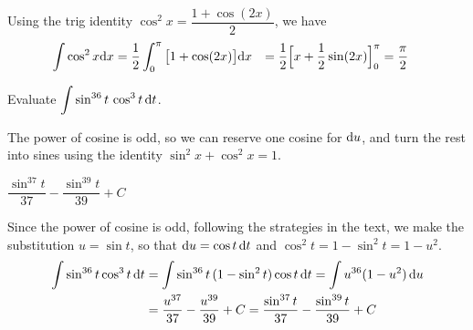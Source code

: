 \begin{solution}
Using the trig identity $\cos^2 x=\dfrac{1+\cos(2x)}{2}$, we have
\begin{alignat*}{3}
\int \cos^2 x\dee{x}
&= \frac{1}{2}\int_0^\pi \big[1+\cos(2x)\big]\dee{x}  %
&= \frac{1}{2} \Big[x+\frac{1}{2}\sin(2x)\Big]_0^\pi
&=\frac{\pi}{2}
\end{alignat*}
\end{solution}



\begin{question}[2016Q3]
Evaluate $\displaystyle\int\sin^{36}t\,\cos^3t\,\mathrm{d}t$.
\end{question}

\begin{hint}
The power of cosine is odd, so we can reserve one cosine for $\mathrm{d}u$, and turn the rest into sines using the identity $\sin^2 x + \cos^2 x =1$.
\end{hint}

\begin{answer}
$\dfrac{\sin^{37}t}{37}-\dfrac{\sin^{39}t}{39}+C$
\end{answer}

\begin{solution}
Since the power of cosine is odd, following the strategies in the text, we make the substitution $u=\sin t$, so that $\mathrm{d}u=\cos t\,\mathrm{d}t$
and $\cos^2 t = 1-\sin^2 t = 1-u^2$.
\begin{align*}
\int\sin^{36}t\cos^3t\,\mathrm{d}t
&=\int\sin^{36}t \, (1-\sin^2t)\cos t\,\mathrm{d}t
=\int u^{36}(1-u^2)\,\mathrm{d}u\\
&=\frac{u^{37}}{37}-\frac{u^{39}}{39}+C
=\frac{\sin^{37}t}{37}-\frac{\sin^{39}t}{39}+C
\end{align*}
\end{solution}


